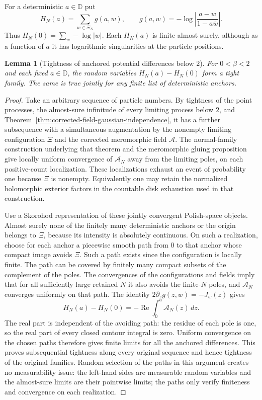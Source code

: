 \documentclass[11pt,a4paper]{article}
\numberwithin{equation}{section}
\newtheorem{lemma}[theorem]{Lemma}
\theoremstyle{definition}
\theoremstyle{remark}
\newcommand{\D}{\mathbb D}
\begin{document}
For a deterministic $a\in\D$ put
\[
 H_N(a)=\sum_{w\in\Xi_N}g(a,w),\qquad
 g(a,w)=-\log\left|\frac{a-w}{1-a\bar w}\right|.
\]
Thus $H_N(0)=\sum_w-\log|w|$.  Each $H_N(a)$ is finite almost surely,
although as a function of $a$ it has logarithmic singularities at the
particle positions.

\begin{lemma}[Tightness of anchored potential differences below $2$]
\label{lem:anchored-potential-difference-tight}
For $0<\beta<2$ and each fixed $a\in\D$, the random variables
$H_N(a)-H_N(0)$ form a tight family.  The same is true jointly for any
finite list of deterministic anchors.
\end{lemma}

\begin{proof}
Take an arbitrary sequence of particle numbers.  By tightness of the
point processes, the almost-sure infinitude of every limiting process
below $2$, and Theorem~\ref{thm:corrected-field-gaussian-independence},
it has a further subsequence with a simultaneous augmentation by the
nonempty limiting configuration $\Xi$ and the corrected meromorphic
field $\mathcal A$.  The normal-family construction underlying that
theorem and the meromorphic gluing proposition give locally uniform
convergence of $\mathcal A_N$ away from the limiting poles, on each
positive-count localization.  These localizations exhaust an event of
probability one because $\Xi$ is nonempty.  Equivalently one may retain
the normalized holomorphic exterior factors in the countable disk
exhaustion used in that construction.

Use a Skorohod representation of these jointly convergent Polish-space
objects.  Almost surely none of the finitely many deterministic anchors
or the origin belongs to $\Xi$, because its intensity is absolutely
continuous.  On such a realization, choose for each anchor a piecewise
smooth path from $0$ to that anchor whose compact image avoids $\Xi$.
Such a path exists since the configuration is locally finite.  The path
can be covered by finitely many compact subsets of the complement of
the poles.  The convergences of the configurations and fields imply that
for all sufficiently large retained $N$ it also avoids the finite-$N$
poles, and $\mathcal A_N$ converges uniformly on that path.  The identity
$2\partial_z g(z,w)=-J_w(z)$ gives
\[
 H_N(a)-H_N(0)
       =-\operatorname{Re}\int_0^a\mathcal A_N(z)\,dz.
\]
The real part is independent of the avoiding path: the residue of each
pole is one, so the real part of every closed contour integral is zero.
Uniform convergence on the chosen paths therefore gives finite limits
for all the anchored differences.  This proves subsequential tightness
along every original sequence and hence tightness of the original
families.  Random selection of the paths in this argument creates no
measurability issue: the left-hand sides are measurable random variables
and the almost-sure limits are their pointwise limits; the paths only
verify finiteness and convergence on each realization.
\end{proof}
\end{document}
